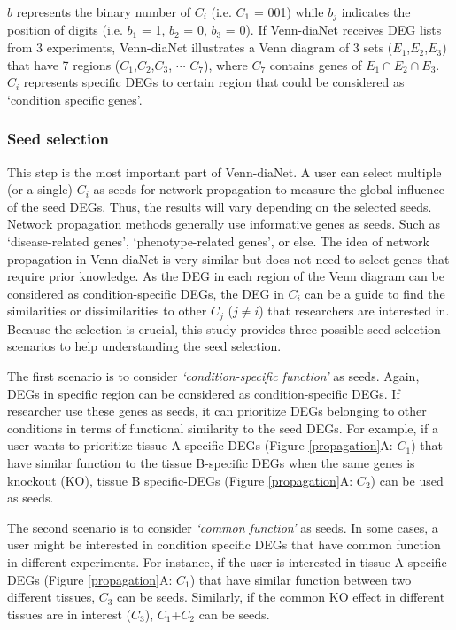 \documentclass[oneside,phd]{snuthesis}
\begin{document}
$b$ represents the binary number of $C_i$ (i.e. $C_1$ = 001) while $b_j$ indicates the position of digits (i.e. $b_1$ = 1, $b_2$ = 0, $b_3$ = 0).
If Venn-diaNet receives DEG lists from 3 experiments, Venn-diaNet illustrates a Venn diagram of 3 sets ($E_1$,$E_2$,$E_3$) that have 7 regions ($C_1$,$C_2$,$C_3$, $\cdots$ $C_7$), where
$C_7$ contains genes of $E_1 \cap E_2 \cap E_3$. 
$C_i$ represents specific DEGs to certain region that could be considered as `condition specific genes’.

\subsubsection{Seed selection}
This step is the most important part of Venn-diaNet. 
A user can select multiple (or a single) $C_i$ as seeds for network propagation to measure the global influence of the seed DEGs.
Thus, the results will vary depending on the selected seeds. 
Network propagation methods generally use informative genes as seeds. Such as `disease-related genes', `phenotype-related genes', or else.
The idea of network propagation in Venn-diaNet is very similar but does not need to select genes that require prior knowledge.
As the DEG in each region of the Venn diagram can be considered as condition-specific DEGs, the DEG in $C_i$ can be a guide to find the similarities or dissimilarities to other $C_j$ ($j \ne i$) that researchers are interested in.
Because the selection is crucial, this study provides three possible seed selection scenarios to help understanding the seed selection.


The first scenario is to consider \textit{`condition-specific function'} as seeds. 
Again, DEGs in specific region can be considered as condition-specific DEGs.
If researcher use these genes as seeds, it can prioritize DEGs belonging to other conditions in terms of functional similarity to the seed DEGs. 
For example, if a user wants to prioritize tissue A-specific DEGs (Figure \ref{propagation}A: $C_{1}$) that have similar function to the tissue B-specific DEGs when the same genes is knockout (KO), tissue B specific-DEGs (Figure \ref{propagation}A: $C_{2}$) can be used as seeds.

The second scenario is to consider \textit{`common function'} as seeds. 
In some cases, a user might be interested in condition specific DEGs that have common function in different experiments.
For instance, if the user is interested in tissue A-specific DEGs (Figure \ref{propagation}A: $C_{1}$) that have similar function between two different tissues, $C_{3}$ can be seeds. 
Similarly, if the common KO effect in different tissues are in interest ($C_{3}$), $C_{1}$+$C_{2}$ can be seeds. 
\end{document}

